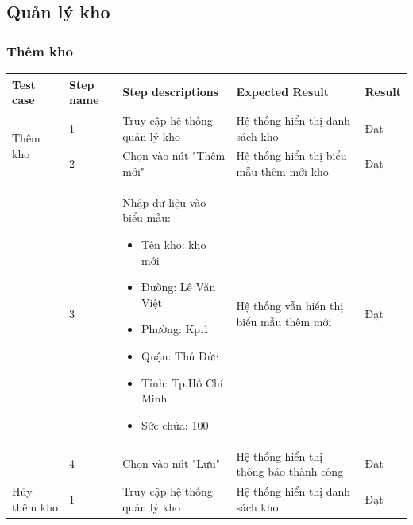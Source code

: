 \subsection{Quản lý kho}
\subsubsection{Thêm kho}
{
    \setlength\extrarowheight{6pt}
    \begin{longtable}{| p{2.5cm}| p{1cm}| p{5.5cm}| p{4.5cm} | p{1.5cm} |}
        \hline
        \textbf{Test case}                   & \textbf{Step name}                       & \textbf{Step descriptions}    & \textbf{Expected Result}                & \textbf{Result} \\
        \hline
        \multirow[t]{2}{2.5cm}{Thêm kho}     & 1                                        & Truy cập hệ thống quản lý kho & Hệ thống hiển thị danh sách kho         & Đạt             \\
        \cline{2-5}
                                             & 2                                        & Chọn vào nút "Thêm mới"       & Hệ thống hiển thị biểu mẫu thêm mới kho & Đạt             \\
        \cline{2-5}
                                             & 3                                        & Nhập dữ liệu vào biểu mẫu:
        \begin{itemize}
            \item Tên kho: kho mới
            \item Đường: Lê Văn Việt
            \item Phường: Kp.1
            \item Quận: Thủ Đức
            \item Tỉnh: Tp.Hồ Chí Minh
            \item Sức chứa: 100
        \end{itemize}           & Hệ thống vẫn hiển thị biểu mẫu thêm mới  & Đạt                                                                                                    \\
        \cline{2-5}
                                             & 4                                        & Chọn vào nút "Lưu"            & Hệ thống hiển thị thông báo thành công  & Đạt             \\
        \hline
        \multirow[t]{2}{2.5cm}{Hủy thêm kho} & 1                                        & Truy cập hệ thống quản lý kho & Hệ thống hiển thị danh sách kho         & Đạt             \\

\end{longtable}}

